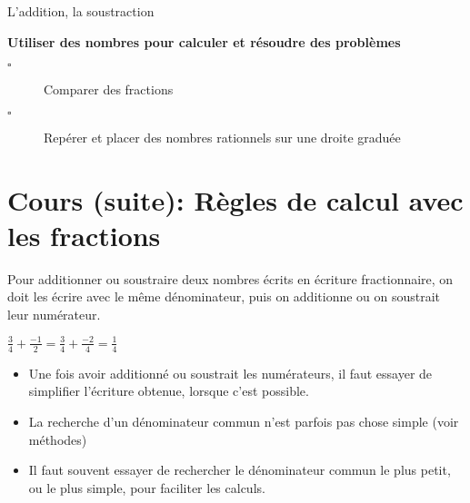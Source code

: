\begin{titre}

{\LARGE {\color{bleu3}L'addition, la soustraction}}
\end{titre}



\begin{CpsCol}
\textbf{Utiliser des nombres pour calculer et résoudre des problèmes}
\begin{description}
\item[$\square$] Comparer des fractions
\item[$\square$] Repérer et placer des nombres rationnels sur une droite graduée
\end{description}
\end{CpsCol}



\section{Cours (suite): Règles de calcul avec les fractions}

\begin{Reg}
Pour additionner ou soustraire deux nombres écrits en écriture fractionnaire, on doit les écrire avec le même dénominateur, puis on additionne ou on soustrait leur numérateur.
\end{Reg}

   
\begin{Ex}   
$\frac{3}{4}+\frac{-1}{2} = \frac{3}{4}+\frac{-2}{4} = \frac{1}{4}$ 
\end{Ex}

\begin{Rq}   
\begin{itemize}
\item Une fois avoir additionné ou soustrait les numérateurs, il faut essayer de simplifier l'écriture obtenue, lorsque c'est possible.
\item La recherche d'un dénominateur commun n'est parfois pas chose simple (voir méthodes)
\item Il faut souvent essayer de rechercher le dénominateur commun le plus petit, ou le plus simple, pour faciliter les calculs.
\end{itemize}
\end{Rq}







